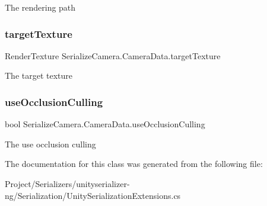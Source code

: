 The rendering path 

\mbox{\label{class_serialize_camera_1_1_camera_data_a548c707699a0015c646fe245ae046122}} 
\subsubsection{\texorpdfstring{target\+Texture}{targetTexture}}
{\footnotesize\ttfamily Render\+Texture Serialize\+Camera.\+Camera\+Data.\+target\+Texture}



The target texture 

\mbox{\label{class_serialize_camera_1_1_camera_data_a7b60a827f405d9fe8f5a267400ef0dee}} 
\subsubsection{\texorpdfstring{use\+Occlusion\+Culling}{useOcclusionCulling}}
{\footnotesize\ttfamily bool Serialize\+Camera.\+Camera\+Data.\+use\+Occlusion\+Culling}



The use occlusion culling 



The documentation for this class was generated from the following file\+:\begin{DoxyCompactItemize}
\item 
Project/\+Serializers/unityserializer-\/ng/\+Serialization/Unity\+Serialization\+Extensions.\+cs\end{DoxyCompactItemize}
